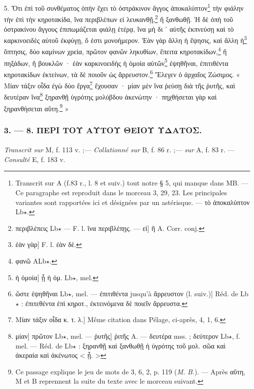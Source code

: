 \documentclass[a4paper, 11pt, oneside, polutonikogreek, french]{article}
\begin{document}
5. Ὅτι ἐπὶ τοῦ συνθέματος ὀπὴν ἔχει τὸ ὀστράκινον ἄγγος ἀποκαλύπτον\footnote{Transcrit sur A (f.83 r., l. 8 et suiv.) tout notre § 5, qui manque dans MB. --- Ce paragraphe est reproduit dans le morceau 3, 29, 23. Les principales variantes sont rapportées ici et désignées par un astérisque. --- τὸ ἀποκαλύπτον Lb$\star$.} τὴν φιάλην τὴν ἐπὶ τὴν κηροτακίδα, ἵνα περιβλέπων εἰ λευκανθῇ,\footnote{περιβλέπεις Lb$\star$ --- F. l. ἵνα περιβλέπῃς. --- εἰ] ἢ A. Corr. conj.} ἢ ξανθωθῇ. Ἡ δὲ ὀπὴ τοῦ ὀστρακίνου ἄγγους ἐπιπωμάζεται φιάλῃ ἑτέρᾳ, ἵνα μὴ δι ᾽ αὐτῆς ἐκπνεύσῃ καὶ τὸ καρκινοειδὲς αὐτοῦ ἐκφύγῃ, ὅ ἐστι μονοήμερον. Ἐὰν γὰρ ἄλλη ἡ ἕψησις, καὶ ἄλλη ἡ\footnote{ἐὰν γὰρ] F. l. ἐὰν δὲ.} ὄπτησις, δύο καμίνων χρεία, πρῶτον φανῶν ληκυθίων, ἔπειτα κηροτακίδων,\footnote{φανῶ ALb$\star$.} ἢ πηξάδων, ἢ βουκλῶν · ἐὰν καρκινοειδὴς ἡ ὁμοία αὐτῶν\footnote{ἡ ὁμοία] ᾖ ἡ ὁμ. Lb$\star$, mel.} ἑψηθῆναι, ἐπιτιθέντα κηροτακίδων ἐκτείνων, τὰ δὲ ποιοῦν ὡς ἄρρευστον.\footnote{ὥστε ἑψηθῆναι Lb$\star$, mel. --- ἐπιτιθέντα jusqu'à ἄρρευστον (l. suiv.)] Réd. de Lb$\star$ : ἐπιτεθέντα ἐπὶ κηροτ., ἐκτεινόμενα δὲ ποιεῖν ἄρρευστα.} Ἔλεγεν ὁ ἀρχαῖος Ζώσιμος. « Μίαν τάξιν οἶδα ἐγὼ δύο ἔργα\footnote{Mίαν τάξιν οἶδα κ. τ. λ.] Même citation dans Pélage, ci-après, 4, 1, 6.} ἔχουσαν · μίαν μὲν ἵνα ῥεύσῃ διὰ τῆς ῥυτῆς, καὶ δευτέραν ἵνα\footnote{μίαν] πρῶτον Lb$\star$, mel. --- ῥυτῆς] ῥιτῆς A. --- δευτέρα mss. ; δεύτερον Lb$\star$, f. mel. --- Réd. de Lb$\star$ : ξηρανθῇ καὶ ξανθωθῇ ἡ ὑγρότης τοῦ μολ. σῶα καὶ ἀκεραία καὶ ἀκένωτος < ᾖ. >} ξηρανθῇ ὑγρότης μολύβδου ἀκενώτην · πηχθήσεται γὰρ καὶ ξηρανθήσεται αὕτη.\footnote{Ce passage explique le jeu de mots de 3, 6, 2, p. 119 (\emph{M. B.}). --- Après αὕτη, M et B reprennent la suite du texte avec le morceau suivant.} »

\bigskip
\centerline{\EightStarTaper}
\centerline{\EightStarTaper\EightStarTaper}
\bigskip

\subsubsection{3. --- 8. ΠΕΡΙ ΤΟΥ ΑΥΤΟΥ ΘΕΙΟΥ ΥΔΑΤΟΣ.}
\paragraph{}
\emph{Transcrit sur} M, f. 113 v. ;--- \emph{Collationné sur} B, f. 86 r. ;--- \emph{sur} A, f. 83 r. --- \emph{Consulté} E, f. 183 v.

\bigskip
\end{document}

